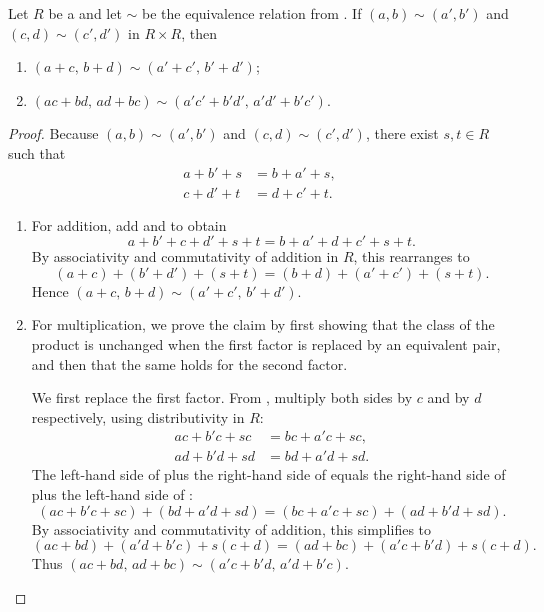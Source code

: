 \begin{proposition} \label{proposition:grothendieck_ring_operations_well_defined}
Let $R$ be a  and let $\sim$ be the equivalence relation from . If $(a,b) \sim (a',b')$ and $(c,d) \sim (c',d')$ in $R \times R$, then
\begin{enumerate}
    \item $(a + c,\, b + d) \sim (a' + c',\, b' + d')$;
    \item $(ac + bd,\, ad + bc) \sim (a'c' + b'd',\, a'd' + b'c')$.
\end{enumerate}
\end{proposition}

\begin{proof}
Because $(a,b) \sim (a',b')$ and $(c,d) \sim (c',d')$, there exist $s, t \in R$ such that
\begin{align}
    a + b' + s &= b + a' + s, \label{eq:witness1} \\
    c + d' + t &= d + c' + t. \label{eq:witness2}
\end{align}

\begin{enumerate}
    \item For addition, add  and  to obtain
    $$a + b' + c + d' + s + t = b + a' + d + c' + s + t.$$
    By associativity and commutativity of addition in $R$, this rearranges to
    $$(a + c) + (b' + d') + (s + t) = (b + d) + (a' + c') + (s + t).$$
    Hence $(a + c,\, b + d) \sim (a' + c',\, b' + d')$.

    \item For multiplication, we prove the claim by first showing that the class of the product is unchanged when the first factor is replaced by an equivalent pair, and then that the same holds for the second factor.

    We first replace the first factor. From , multiply both sides by $c$ and by $d$ respectively, using distributivity in $R$:
    \begin{align}
        ac + b'c + sc &= bc + a'c + sc, \label{eq:m1} \\
        ad + b'd + sd &= bd + a'd + sd. \label{eq:m2}
    \end{align}
    The left-hand side of  plus the right-hand side of  equals the right-hand side of  plus the left-hand side of :
    $$(ac + b'c + sc) + (bd + a'd + sd) = (bc + a'c + sc) + (ad + b'd + sd).$$
    By associativity and commutativity of addition, this simplifies to
    $$(ac + bd) + (a'd + b'c) + s(c+d) = (ad + bc) + (a'c + b'd) + s(c+d).$$
    Thus $(ac + bd,\, ad + bc) \sim (a'c + b'd,\, a'd + b'c)$.


\end{enumerate}
\end{proof}

